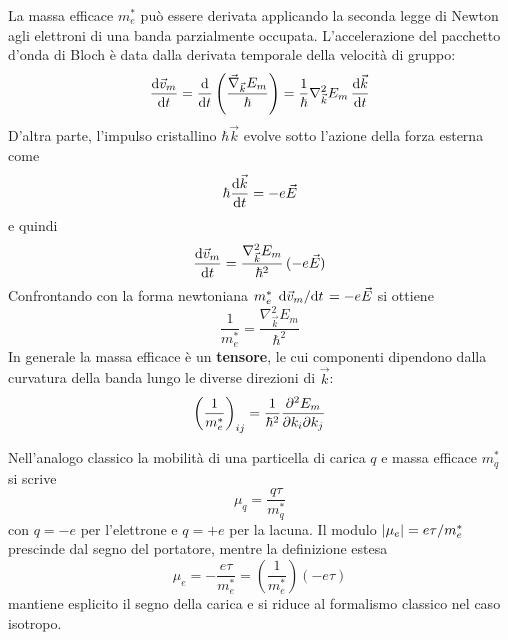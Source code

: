 La massa efficace \( m_e^* \) può essere derivata applicando la seconda legge di Newton agli elettroni di una banda parzialmente occupata. L'accelerazione del pacchetto d'onda di Bloch è data dalla derivata temporale della velocità di gruppo:
\begin{equation}
    \dv{\vec{v}_m}{t} = \dv{t} \left( \frac{\vec{\nabla}_{\vec{k}} E_m}{\hbar} \right) = \frac{1}{\hbar} \nabla_{\vec{k}}^2 E_m \, \dv{\vec{k}}{t}
\end{equation}
D'altra parte, l'impulso cristallino \( \hbar \vec{k} \) evolve sotto l'azione della forza esterna come
\begin{equation}
    \hbar \dv{\vec{k}}{t} = -e \vec{E}
\end{equation}
e quindi
\begin{equation}
    \dv{\vec{v}_m}{t} = \frac{\nabla_{\vec{k}}^2 E_m}{\hbar^2} \, (-e \vec{E})
\end{equation}
Confrontando con la forma newtoniana \( m_e^* \, \dv*{\vec{v}_m}{t} = -e \vec{E} \) si ottiene
\begin{equation}
    \frac{1}{m_e^*} = \frac{\nabla_{\vec{k}}^2 E_m}{\hbar^2}
\end{equation}
In generale la massa efficace è un \textbf{tensore}, le cui componenti dipendono dalla curvatura della banda lungo le diverse direzioni di \( \vec{k} \):
\begin{equation}
    \left( \frac{1}{m_e^*} \right)_{ij} = \frac{1}{\hbar^2} \pdv{E_m}{k_i}{k_j}
\end{equation}

\begin{remark}
    Nell'analogo classico la mobilità di una particella di carica \( q \) e massa efficace \( m_q^* \) si scrive
    \begin{equation}
        \mu_q = \frac{q \tau}{m_q^*}
    \end{equation}
    con \( q = -e \) per l'elettrone e \( q = +e \) per la lacuna. Il modulo \( \abs{\mu_e} = e \tau / m_e^* \) prescinde dal segno del portatore, mentre la definizione estesa
    \begin{equation}
        \mu_e = -\frac{e \tau}{m_e^*} = \left( \frac{1}{m_e^*} \right) (-e \tau)
    \end{equation}
    mantiene esplicito il segno della carica e si riduce al formalismo classico nel caso isotropo.
\end{remark}

